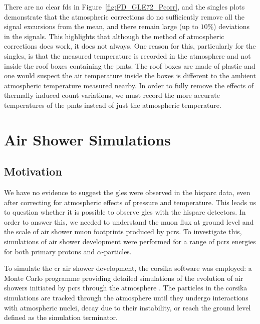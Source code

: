 There are no clear \glspl{fd} in Figure~\ref{fig:FD_GLE72_Pcorr}, and the singles plots demonstrate that the atmospheric corrections do no sufficiently remove all the signal excursions from the mean, and there remain large (up to $10\%$) deviations in the signals. This highlights that although the method of atmospheric corrections does work, it does not always. One reason for this, particularly for the singles, is that the measured temperature is recorded in the atmosphere and not inside the roof boxes containing the \glspl{pmt}. The roof boxes are made of plastic and one would suspect the air temperature inside the boxes is different to the ambient atmospheric temperature measured nearby. In order to fully remove the effects of thermally induced count variations, we must record the more accurate temperatures of the \glspl{pmt} instead of just the atmospheric temperature.



\section{Air Shower Simulations}\label{sec:CORSIKA}

\subsection{Motivation}

We have no evidence to suggest the \glspl{gle} were observed in the \gls{hisparc} data, even after correcting for atmospheric effects of pressure and temperature. This leads us to question whether it is possible to observe \glspl{gle} with the \gls{hisparc} detectors. In order to answer this, we needed to understand the muon flux at ground level and the scale of air shower muon footprints produced by \glspl{pcr}. To investigate this, simulations of air shower development were performed for a range of \glspl{pcr} energies for both primary protons and $\alpha$-particles. 

To simulate the \gls{cr} air shower development, the \gls{corsika} software was employed: a Monte Carlo programme providing detailed simulations of the evolution of air showers initiated by \glspl{pcr} through the atmosphere \citep{heck_extensive_2017}. The particles in the \gls{corsika} simulations are tracked through the atmosphere until they undergo interactions with atmospheric nuclei, decay due to their instability, or reach the ground level defined as the simulation terminator.

